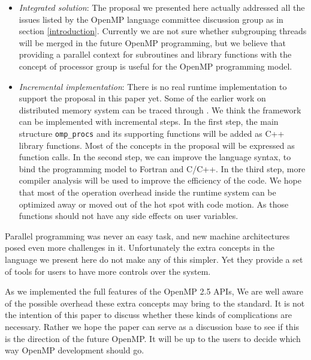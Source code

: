 \begin{itemize}
\item \emph{Integrated solution}: The proposal we presented here actually
  addressed all the issues listed by the OpenMP language committee discussion
  group as in section \ref{introduction}. Currently we are not sure whether
  subgrouping threads will be merged in the future OpenMP programming, but we
  believe that providing a parallel context for subroutines and library
  functions with the concept of processor group is useful for the OpenMP
  programming model.

\item \emph{Incremental implementation}: There is no real runtime
  implementation to support the proposal in this paper yet. Some of the earlier
  work on distributed memory system can be traced through \cite{Zha98}. We
  think the framework can be implemented with incremental steps. In the first
  step, the main structure \texttt{omp\_procs} and its supporting functions
  will be added as C++ library functions. Most of the concepts in the proposal
  will be expressed as function calls. In the second step, we can improve the
  language syntax, to bind the programming model to Fortran and C/C++. In the
  third step, more compiler analysis will be used to improve the efficiency of
  the code. We hope that most of the operation overhead inside the runtime
  system can be optimized away or moved out of the hot spot with code motion.
  As those functions should not have any side effects on user variables.

\end{itemize}

Parallel programming was never an easy task, and new machine architectures
posed even more challenges in it. Unfortunately the extra concepts in the
language we present here do not make any of this simpler. Yet they provide a
set of tools for users to have more controls over the system.

As we implemented the full features of the OpenMP 2.5 APIs, We are well aware
of the possible overhead these extra concepts may bring to the standard. It is
not the intention of this paper to discuss whether these kinds of complications
are necessary. Rather we hope the paper can serve as a discussion base to see
if this is the direction of the future OpenMP. It will be up to the users to
decide which way OpenMP development should go.

